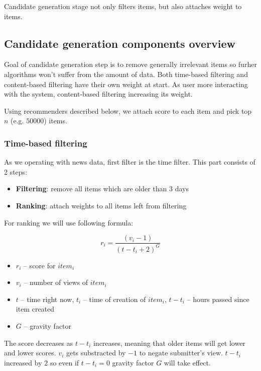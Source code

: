 \documentclass{article}
\begin{document}
Candidate generation stage not only filters items, but also attaches weight to items.

\subsection{Candidate generation components overview}

Goal of candidate generation step is to remove generally irrelevant items so furher algorithms won't suffer from the amount of data. Both time-based filtering and content-based filtering have their own weight at start. As user more interacting with the system, content-based filtering increasing its weight.

Using recommenders described below, we attach score to each item and pick top $n$ (e.g. $50 000$) items.

\subsubsection{Time-based filtering}

As we operating with news data, first filter is the time filter. This part consists of 2 steps:

\begin{itemize}
    \item \textbf{Filtering}: remove all items which are older than 3 days
    \item \textbf{Ranking}: attach weights to all items left from filtering
\end{itemize}

For ranking we will use following formula:

$$r_i = \frac{(v_i - 1)}{(t - t_i + 2)^G}$$


\begin{itemize}
    \item $r_i$ -- score for $item_i$
    \item $v_i$ -- number of views of $item_i$
    \item $t$ -- time right now, $t_i$ -- time of creation of $item_i$, $t - t_i$ -- hours passed since item created
    \item $G$ -- gravity factor
\end{itemize}

The score decreases as $t - t_i$ increases, meaning that older items will get lower and lower scores. $v_i$ gets substracted by $-1$ to negate submitter's view. $t - t_i$ increased by $2$ so even if $t - t_i = 0$ gravity factor $G$ will take effect.
\end{document}
